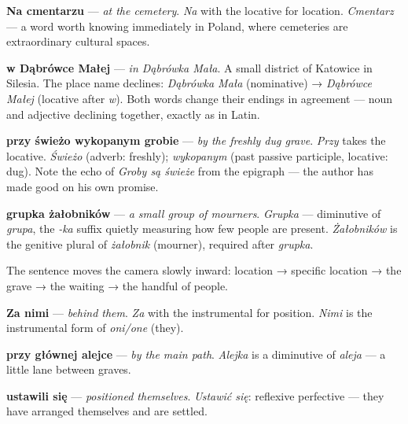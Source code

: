 

\textbf{Na cmentarzu} — \textit{at the cemetery}. \textit{Na} with the locative 
for location. \textit{Cmentarz} — a word worth knowing immediately in Poland, 
where cemeteries are extraordinary cultural spaces.

\textbf{w Dąbrówce Małej} — \textit{in Dąbrówka Mała}. A small district of 
Katowice in Silesia. The place name declines: \textit{Dąbrówka Mała} 
(nominative) → \textit{Dąbrówce Małej} (locative after \textit{w}). 
Both words change their endings in agreement — noun and adjective declining 
together, exactly as in Latin.

\textbf{przy świeżo wykopanym grobie} — \textit{by the freshly dug grave}. 
\textit{Przy} takes the locative. \textit{Świeżo} (adverb: freshly); 
\textit{wykopanym} (past passive participle, locative: dug). Note the echo 
of \textit{Groby są świeże} from the epigraph — the author has made good 
on his own promise.

\textbf{grupka żałobników} — \textit{a small group of mourners}. 
\textit{Grupka} — diminutive of \textit{grupa}, the \textit{-ka} suffix 
quietly measuring how few people are present. \textit{Żałobników} is the 
genitive plural of \textit{żałobnik} (mourner), required after \textit{grupka}.

The sentence moves the camera slowly inward: location → specific location 
→ the grave → the waiting → the handful of people.



\textbf{Za nimi} — \textit{behind them}. \textit{Za} with the instrumental 
for position. \textit{Nimi} is the instrumental form of \textit{oni/one} (they).

\textbf{przy głównej alejce} — \textit{by the main path}. 
\textit{Alejka} is a diminutive of \textit{aleja} — a little lane between graves.

\textbf{ustawili się} — \textit{positioned themselves}. 
\textit{Ustawić się}: reflexive perfective — they have arranged themselves 
and are settled.

